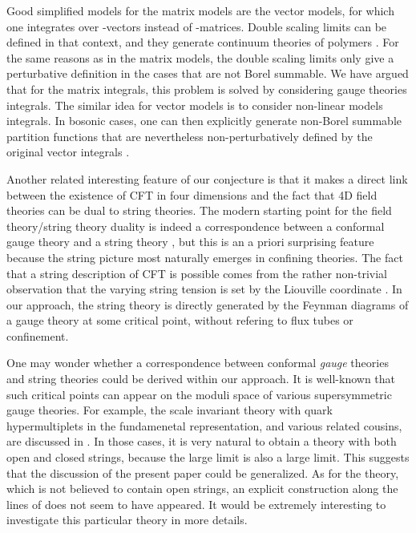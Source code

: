\documentclass[a4paper,12pt]{article}
\begin{document}
{Good simplified models for 
the \coordHE{} matrix models are the vector models, for which one 
integrates 
over \coordHE{}-vectors instead of \coordHE{}-matrices. Double scaling limits 
can be defined in that context, and they generate
continuum theories of polymers \cite{polym,ZJM}. 
For the same reasons as in the matrix models, the double scaling limits 
only give a perturbative definition in the cases that are not Borel summable.
We have argued that for the matrix integrals, this problem is
solved by considering gauge theories integrals. The similar idea for
vector models is to consider non-linear \myHighlight{$\sigma$}\coordHE{} models integrals.
In bosonic cases, 
one can then explicitly generate non-Borel summable partition functions 
that are nevertheless non-perturbatively defined by the original vector 
integrals \cite{fer4}.

Another related interesting feature of our conjecture is that 
it makes a direct link between the existence of CFT in four dimensions
and the fact that 4D field theories can be dual to string theories.
The modern starting point for the field theory/string theory duality is 
indeed a correspondence between a conformal gauge theory and a string 
theory \cite{malda}, 
but this is an a priori surprising feature because the string 
picture most naturally emerges in confining theories. The fact that a 
string description of CFT is possible comes from the rather non-trivial 
observation that the varying
string tension is set by the Liouville coordinate \cite{wall}. In our 
approach, the string theory is directly generated by the Feynman diagrams 
of a gauge theory at some critical point, without refering to flux 
tubes or confinement. 

One may wonder whether a correspondence between conformal {\it gauge} 
theories and string theories could be derived within our approach. It is 
well-known that such critical points can appear on the moduli space of 
various \coordHE{} supersymmetric gauge theories. For example, the scale
invariant \coordHE{} theory with 
\coordHE{} quark hypermultiplets in the fundamenetal representation, 
and various related cousins, are discussed in \cite{arg}. In those cases, 
it is very natural to obtain a theory with both open and closed strings, 
because the large \coordHE{} limit is also a large \coordHE{} limit. This 
suggests that the discussion of the present paper could be generalized.
As for the \coordHE{} theory, which is not believed to 
contain open strings, an explicit construction along the lines of 
\cite{arg} does not seem to have appeared. It would be extremely 
interesting to investigate this particular theory in more details.
%
}
\end{document}
